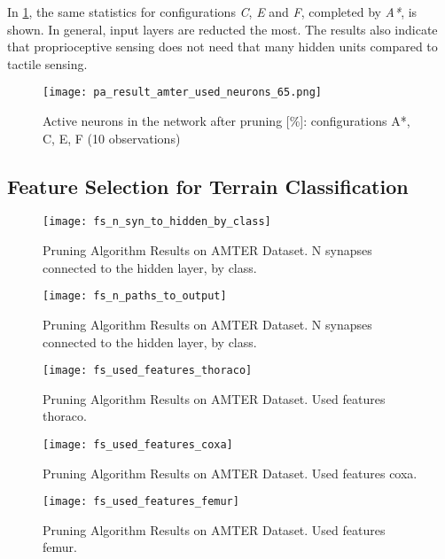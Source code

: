 In \cref{fig:pa_amter_used_neurons_65}, the same statistics for configurations \textit{C}, \textit{E} and \textit{F}, completed by \textit{A*}, is shown. In general, input layers are reducted the most. The results also indicate that proprioceptive sensing does not need that many hidden units compared to tactile sensing.

\begin{figure}[H]
  \centering
  \texttt{[image: pa\_result\_amter\_used\_neurons\_65.png]}
  \caption{Active neurons in the network after pruning [\%]: configurations A*, C, E, F (10 observations)}
  \label{fig:pa_amter_used_neurons_65}
\end{figure}

\subsection{Feature Selection for Terrain Classification} \label{ssec:pa_amter_feature_selection}

\begin{figure}[H]
  \centering
  \texttt{[image: fs\_n\_syn\_to\_hidden\_by\_class]}
  \caption{Pruning Algorithm Results on AMTER Dataset. N synapses connected to the hidden layer, by class.}
  \label{fig:pa_amter_n_syn_to_hidden_by_class}
\end{figure}

\begin{figure}[H]
  \centering
  \texttt{[image: fs\_n\_paths\_to\_output]}
  \caption{Pruning Algorithm Results on AMTER Dataset. N synapses connected to the hidden layer, by class.}
  \label{fig:pa_amter_n_syn_to_hidden_by_class}
\end{figure}

\begin{figure}[H]
  \centering
  \texttt{[image: fs\_used\_features\_thoraco]}
  \caption{Pruning Algorithm Results on AMTER Dataset. Used features thoraco.}
  \label{fig:pa_amter_used_features_thoraco}
\end{figure}

\begin{figure}[H]
  \centering
  \texttt{[image: fs\_used\_features\_coxa]}
  \caption{Pruning Algorithm Results on AMTER Dataset. Used features coxa.}
  \label{fig:pa_amter_used_features_coxa}
\end{figure}

\begin{figure}[H]
  \centering
  \texttt{[image: fs\_used\_features\_femur]}
  \caption{Pruning Algorithm Results on AMTER Dataset. Used features femur.}
  \label{fig:pa_amter_used_features_femur}
\end{figure}

